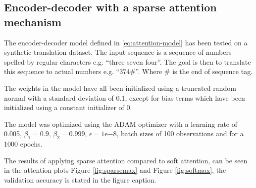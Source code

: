 \subsection{Encoder-decoder with a sparse attention mechanism}
The encoder-decoder model defined in \eqref{eq:attention-model} has been tested on a synthetic translation dataset. The input sequence is a sequence of numbers spelled by regular characters e.g. ``three seven four''. The goal is then to translate this sequence to actual numbers e.g. ``374\#''. Where \# is the end of sequence tag.

The weights in the model have all been initialized using a truncated random normal with a standard deviation of 0.1, except for bias terms which have been initialized using a constant initializer of 0.

The model was optimized using the ADAM optimizer with a learning rate of 0.005, $\beta_1=0.9, \, \beta_2 = 0.999, \, \epsilon = 1\mathrm{e}{-8}$, batch sizes of 100 observations and for a 1000 epochs.

The results of applying sparse attention compared to soft attention, can be seen in the attention plots Figure \ref{fig:sparsemax} and Figure \ref{fig:softmax}, the validation accuracy is stated in the figure caption.

